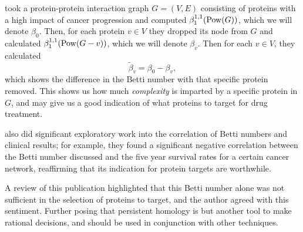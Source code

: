 \textcite{benzekry2015design} took a protein-protein interaction graph $G = (V,E)$ consisting of proteins with a high impact of cancer progression and computed $\beta_1^{1,1}(\operatorname{Pow}(G))$, which we will denote $\beta_0$. Then, for each protein $v \in V$ they dropped its node from $G$ and calculated $\beta_1^{1,1}(\operatorname{Pow}(G - v))$, which we will denote $\beta_v$. Then for each $v \in V$, they calculated
\[ \tilde\beta_v = \beta_0 - \beta_v, \]
which shows the difference in the Betti number with that specific protein removed. This shows us how much \emph{complexity} is imparted by a specific protein in $G$, and may give us a good indication of what proteins to target for drug treatment.

\textcite{benzekry2015design} also did significant exploratory work into the correlation of Betti numbers and clinical results; for example, they found a significant negative correlation between the Betti number discussed and the five year survival rates for a certain cancer network, reaffirming that its indication for protein targets are worthwhile.

A review of this publication highlighted that this Betti number alone was not sufficient in the selection of proteins to target, and the author agreed with this sentiment. Further posing that persistent homology is but another tool to make rational decisions, and should be used in conjunction with other techniques.
